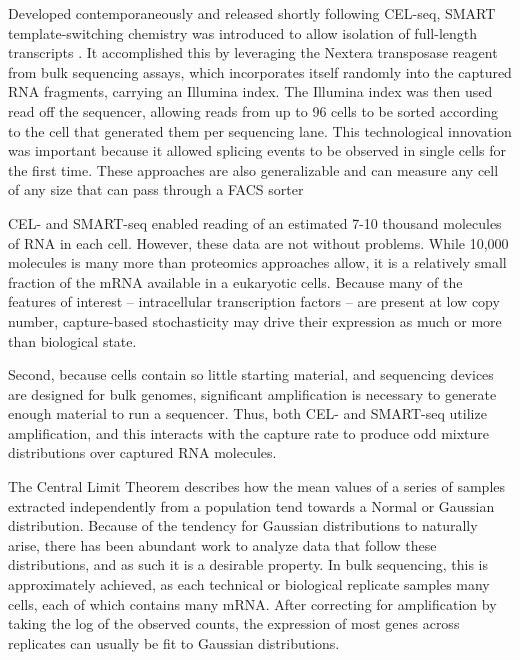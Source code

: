 Developed contemporaneously and released shortly following CEL-seq, SMART template-switching chemistry was introduced to allow isolation of full-length transcripts \citep{Ramskoeld2012}.
It accomplished this by leveraging the Nextera transposase reagent from bulk sequencing assays, which incorporates itself randomly into the captured RNA fragments, carrying an Illumina index. 
The Illumina index was then used read off the sequencer, allowing reads from up to 96 cells to be sorted according to the cell that generated them per sequencing lane.
This technological innovation was important because it allowed splicing events to be observed in single cells for the first time.
These approaches are also generalizable and can measure any cell of any size that can pass through a FACS sorter

CEL- and SMART-seq enabled reading of an estimated 7-10 thousand molecules of RNA in each cell. 
However, these data are not without problems. 
While 10,000 molecules is many more than proteomics approaches allow, it is a relatively small fraction of the mRNA available in a eukaryotic cells. 
Because many of the features of interest -- intracellular transcription factors -- are present at low copy number, capture-based stochasticity may drive their expression as much or more than biological state. 

Second, because cells contain so little starting material, and sequencing devices are designed for bulk genomes, significant amplification is necessary to generate enough material to run a sequencer. 
Thus, both CEL- and SMART-seq utilize amplification, and this interacts with the capture rate to produce odd mixture distributions over captured RNA molecules. 

The Central Limit Theorem describes how the mean values of a series of samples extracted independently from a population tend towards a Normal or Gaussian distribution.
Because of the tendency for Gaussian distributions to naturally arise, there has been abundant work to analyze data that follow these distributions, and as such it is a desirable property. 
In bulk sequencing, this is approximately achieved, as each technical or biological replicate samples many cells, each of which contains many mRNA. 
After correcting for amplification by taking the log of the observed counts, the expression of most genes across replicates can usually be fit to Gaussian distributions. %

